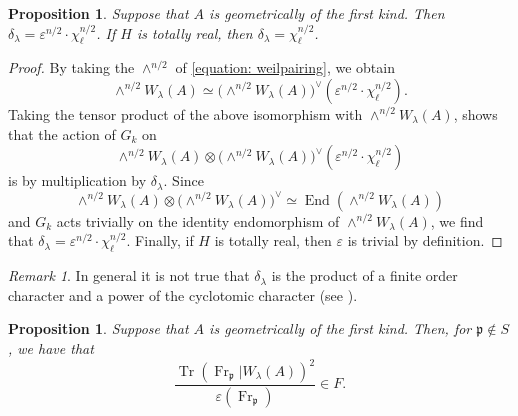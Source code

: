 \documentclass[oneside]{amsart}
\newtheorem{proposition}[theorem]{Proposition}
\theoremstyle{remark}
\newtheorem{remark}[theorem]{Remark}
\newcommand{\End}{\operatorname{End}}
\newcommand{\Frob}{\operatorname{Fr}}
\newcommand{\p}{\mathfrak{p}}
\newcommand{\Tr}{\operatorname{Tr}}
\numberwithin{equation}{section}
\begin{document}
\begin{proposition}\label{proposition: characterChi}
Suppose that $A$ is geometrically of the first kind. Then  $\delta_\lambda=\varepsilon^{n/2}\cdot \chi_\ell^{n/2}$. If $H$ is totally real, then $\delta_\lambda=\chi_\ell^{n/2}$.
\end{proposition}

\begin{proof}
By taking the $\wedge^{n/2}$ of \eqref{equation: weilpairing}, we obtain
\begin{equation}\label{equation: firstclue}
\wedge^ {n/2} W_\lambda(A)\simeq \big(\wedge^{n/2} W_\lambda(A)\big)^\vee(\varepsilon^{n/2}\cdot \chi_\ell^{n/2}).
\end{equation}
Taking the tensor product of the above isomorphism with $\wedge^{n/2} W_\lambda(A)$, shows that the action of $G_k$
on 
$$
\wedge^ {n/2} W_\lambda(A)\otimes \big(\wedge^{n/2} W_\lambda(A)\big)^\vee(\varepsilon^{n/2}\cdot \chi_\ell^{n/2})
$$
is by multiplication by $\delta_\lambda$. Since  $$\wedge^ {n/2} W_\lambda(A)\otimes \big(\wedge^{n/2} W_\lambda(A)\big)^\vee\simeq \End(\wedge^ {n/2} W_\lambda(A))$$ and $G_k$ acts trivially on the identity endomorphism of $\wedge^ {n/2} W_\lambda(A)$,  we find that $\delta_\lambda=\varepsilon^{n/2}\cdot \chi_\ell^{n/2}$. 
Finally, if $H$ is totally real, then $\varepsilon$ is trivial by definition.
\end{proof}

\begin{remark} In general it is not true that $\delta_\lambda$ is the product of a finite order character and a power of the cyclotomic character (see \cite[\S7 and Rmk. 17]{Fit24}).
\end{remark}


\begin{proposition}\label{prop: center over Qbar}
Suppose that $A$ is geometrically of the first kind. Then, for $\p \not \in S$, we have that
$$
\frac{\Tr(\Frob_\p| W_\lambda(A))^2}{\varepsilon(\Frob_\p)}\in F.
$$
\end{proposition}
\end{document}
